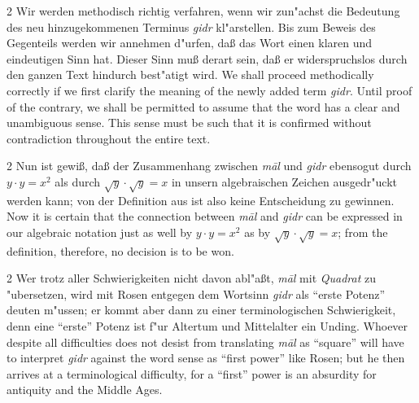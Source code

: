 \documentclass[10pt,a4paper]{article}
\renewcommand{\switchcolumn}{\syncronize\nointerlineskip\columnbreak}
\newcommand{\enquote}[1]{``#1''}
\begin{document}
\begin{paracol}{2}
Wir werden methodisch richtig verfahren, wenn wir zun"achst die Bedeutung des neu hinzugekommenen Terminus \textit{gidr} kl"arstellen. Bis zum Beweis des Gegenteils werden wir annehmen d"urfen, da\ss{} das Wort einen klaren und eindeutigen Sinn hat. Dieser Sinn mu\ss{} derart sein, da\ss{} er widerspruchslos durch den ganzen Text hindurch best"atigt wird.
\switchcolumn
We shall proceed methodically correctly if we first clarify the meaning of the newly added term \textit{gidr}. Until proof of the contrary, we shall be permitted to assume that the word has a clear and unambiguous sense. This sense must be such that it is confirmed without contradiction throughout the entire text.
\end{paracol}

\begin{paracol}{2}
Nun ist gewi\ss{}, da\ss{} der Zusammenhang zwischen \textit{m\=al} und \textit{gidr} ebensogut durch $y \cdot y = x^{2}$ als durch $\sqrt{y} \cdot \sqrt{y} = x$ in unsern algebraischen Zeichen ausgedr"uckt werden kann; von der Definition aus ist also keine Entscheidung zu gewinnen.
\switchcolumn
Now it is certain that the connection between \textit{m\=al} and \textit{gidr} can be expressed in our algebraic notation just as well by $y \cdot y = x^{2}$ as by $\sqrt{y} \cdot \sqrt{y} = x$; from the definition, therefore, no decision is to be won.
\end{paracol}

\begin{paracol}{2}
Wer trotz aller Schwierigkeiten nicht davon abl"a\ss{}t, \textit{m\=al} mit \textit{Quadrat} zu "ubersetzen, wird mit Rosen entgegen dem Wortsinn \textit{gidr} als \enquote{erste Potenz} deuten m"ussen; er kommt aber dann zu einer terminologischen Schwierigkeit, denn eine \enquote{erste} Potenz ist f"ur Altertum und Mittelalter ein Unding.
\switchcolumn
Whoever despite all difficulties does not desist from translating \textit{m\=al} as ``square'' will have to interpret \textit{gidr} against the word sense as ``first power'' like Rosen; but he then arrives at a terminological difficulty, for a ``first'' power is an absurdity for antiquity and the Middle Ages.
\end{paracol}
\end{document}
